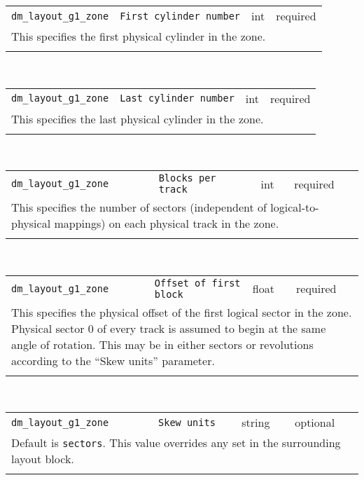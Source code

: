 \noindent 
\begin{tabular}{|p{\lpmodwidth}|p{\lpnamewidth}|p{0.5in}|p{0.5in}|}
\cline{1-4}
\texttt{dm\_layout\_g1\_zone} & \texttt{First cylinder number} & int & required \\ 
\cline{1-4}
\multicolumn{4}{|p{6in}|}{
This specifies the first physical cylinder in the zone.
}\\ 
\cline{1-4}
\multicolumn{4}{p{5in}}{}\\
\end{tabular}\\ 
\noindent 
\begin{tabular}{|p{\lpmodwidth}|p{\lpnamewidth}|p{0.5in}|p{0.5in}|}
\cline{1-4}
\texttt{dm\_layout\_g1\_zone} & \texttt{Last cylinder number} & int & required \\ 
\cline{1-4}
\multicolumn{4}{|p{6in}|}{
This specifies the last physical cylinder in the zone.
}\\ 
\cline{1-4}
\multicolumn{4}{p{5in}}{}\\
\end{tabular}\\ 
\noindent 
\begin{tabular}{|p{\lpmodwidth}|p{\lpnamewidth}|p{0.5in}|p{0.5in}|}
\cline{1-4}
\texttt{dm\_layout\_g1\_zone} & \texttt{Blocks per track} & int & required \\ 
\cline{1-4}
\multicolumn{4}{|p{6in}|}{
This specifies the number of sectors (independent of logical-to-physical
mappings) on each physical track in the zone.
}\\ 
\cline{1-4}
\multicolumn{4}{p{5in}}{}\\
\end{tabular}\\ 
\noindent 
\begin{tabular}{|p{\lpmodwidth}|p{\lpnamewidth}|p{0.5in}|p{0.5in}|}
\cline{1-4}
\texttt{dm\_layout\_g1\_zone} & \texttt{Offset of first block} & float & required \\ 
\cline{1-4}
\multicolumn{4}{|p{6in}|}{
This specifies the physical offset of the first logical sector in the
zone. Physical sector 0 of every track is assumed to begin at the
same angle of rotation. This may be in either sectors or revolutions
according to the ``Skew units'' parameter.
}\\ 
\cline{1-4}
\multicolumn{4}{p{5in}}{}\\
\end{tabular}\\ 
\noindent 
\begin{tabular}{|p{\lpmodwidth}|p{\lpnamewidth}|p{0.5in}|p{0.5in}|}
\cline{1-4}
\texttt{dm\_layout\_g1\_zone} & \texttt{Skew units} & string & optional \\ 
\cline{1-4}
\multicolumn{4}{|p{6in}|}{
Default is \texttt{sectors}. This value overrides any set in the
surrounding layout block.
}\\ 
\cline{1-4}
\multicolumn{4}{p{5in}}{}\\
\end{tabular}\\ 
